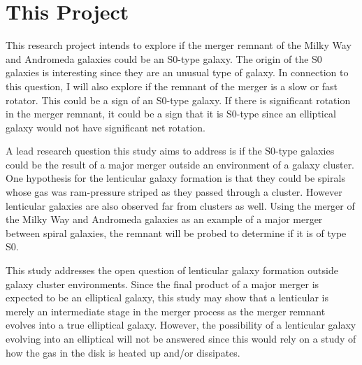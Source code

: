 \documentclass[fleqn,usenatbib]{mnras}
\begin{document}

\section{This Project}
This research project intends to explore if the merger remnant of the Milky Way and Andromeda galaxies could be an S0-type galaxy. The origin of the S0 galaxies is interesting since they are an unusual type of galaxy. In connection to this question, I will also explore if the remnant of the merger is a slow or fast rotator. This could be a sign of an S0-type galaxy. If there is significant rotation in the merger remnant, it could be a sign that it is S0-type since an elliptical galaxy would not have significant net rotation.

A lead research question this study aims to address is if the S0-type galaxies could be the result of a major merger outside an environment of a galaxy cluster. One hypothesis for the lenticular galaxy formation is that they could be spirals whose gas was ram-pressure striped as they passed through a cluster. However lenticular galaxies are also observed far from clusters as well. Using the merger of the Milky Way and Andromeda galaxies as an example of a major merger between spiral galaxies, the remnant will be probed to determine if it is of type S0.

This study addresses the open question of lenticular galaxy formation outside galaxy cluster environments. Since the final product of a major merger is expected to be an elliptical galaxy, this study may show that a lenticular is merely an intermediate stage in the merger process as the merger remnant evolves into a true elliptical galaxy. However, the possibility of a lenticular galaxy evolving into an elliptical will not be answered since this would rely on a study of how the gas in the disk is heated up and/or dissipates. 
\end{document}
